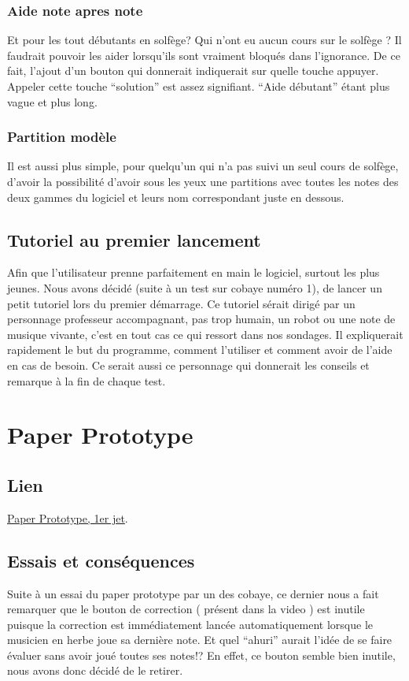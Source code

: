 \documentclass{article}
\begin{document}
\subsubsection{Aide note apres note}
Et pour les tout débutants en solfège? Qui n'ont eu aucun cours sur le solfège ? Il faudrait pouvoir les aider lorsqu'ils sont 
vraiment bloqués dans l'ignorance. De ce fait, l'ajout d'un bouton qui donnerait indiquerait sur quelle touche appuyer.
Appeler cette touche ``solution'' est assez signifiant. ``Aide débutant'' étant plus vague et plus long.
\subsubsection{Partition modèle}
Il est aussi plus simple, pour quelqu'un qui n'a pas suivi un seul cours de solfège, d'avoir la possibilité d'avoir sous les yeux une
partitions avec toutes les notes des deux gammes du logiciel et leurs nom correspondant juste en dessous.
\subsection{Tutoriel au premier lancement}
Afin que l'utilisateur prenne parfaitement en main le logiciel, surtout les plus jeunes. Nous avons décidé (suite à un test sur cobaye numéro 1),
de lancer un petit tutoriel lors du premier démarrage. Ce tutoriel sérait dirigé par un personnage professeur accompagnant,
pas trop humain, un robot ou une note de musique vivante, c'est en tout cas ce qui ressort dans nos sondages.
Il expliquerait rapidement le but du programme, comment l'utiliser et comment avoir de l'aide en cas de besoin.
Ce serait aussi ce personnage qui donnerait les conseils et remarque à la fin de chaque test.





\section{Paper Prototype}
\subsection{Lien}
\href{https://www.youtube.com/watch?v=gwFMDVW2Swo}{Paper Prototype, 1er jet}.
\subsection{Essais et conséquences}
Suite à un essai du paper prototype par un des cobaye, ce dernier nous a fait remarquer que le bouton de correction ( présent dans la video )
est inutile puisque la correction est immédiatement lancée automatiquement lorsque le musicien en herbe joue sa dernière note. Et 
quel ``ahuri'' aurait l'idée de se faire évaluer sans avoir joué toutes ses notes!?
En effet, ce bouton semble bien inutile, nous avons donc décidé de le retirer.
\end{document}
